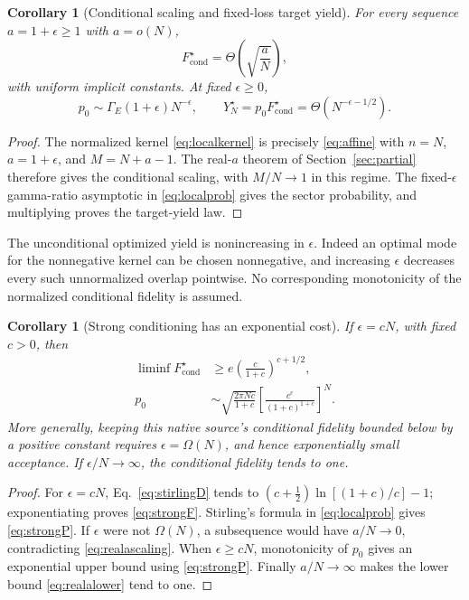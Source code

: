 \documentclass[11pt,a4paper]{article}
\newtheorem{corollary}[theorem]{Corollary}
\newcommand{\GE}{\Gamma_{\!E}}
\begin{document}
\begin{corollary}[Conditional scaling and fixed-loss target yield]
For every sequence \(a=1+\epsilon\ge1\) with \(a=o(N)\),
\begin{equation}
 F_{\mathrm{cond}}^\star
 =\Theta\!\left(\sqrt{\frac aN}\right),
 \label{eq:localconditionalscaling}
\end{equation}
with uniform implicit constants. At fixed \(\epsilon\ge0\),
\begin{equation}
 p_0\sim\GE(1+\epsilon)N^{-\epsilon},\qquad
 Y_N^\star=p_0F_{\mathrm{cond}}^\star
 =\Theta(N^{-\epsilon-1/2}).
 \label{eq:fixedlossyield}
\end{equation}
\end{corollary}
\begin{proof}
The normalized kernel \eqref{eq:localkernel} is precisely
\eqref{eq:affine} with \(n=N\), \(a=1+\epsilon\), and
\(M=N+a-1\). The real-\(a\) theorem of Section~\ref{sec:partial}
therefore gives the conditional scaling, with
\(M/N\to1\) in this regime. The fixed-\(\epsilon\) gamma-ratio
asymptotic in \eqref{eq:localprob} gives the sector probability,
and multiplying proves the target-yield law.
\end{proof}

The unconditional optimized yield is nonincreasing in \(\epsilon\).
Indeed an optimal mode for the nonnegative kernel can be chosen
nonnegative, and increasing \(\epsilon\) decreases every such
unnormalized overlap pointwise. No corresponding monotonicity of
the normalized conditional fidelity is assumed.

\begin{corollary}[Strong conditioning has an exponential cost]
If \(\epsilon=cN\), with fixed \(c>0\), then
\begin{align}
 \liminf F_{\mathrm{cond}}^\star
 &\ge e\left(\frac c{1+c}\right)^{c+1/2}, \label{eq:strongF}\\
 p_0&\sim\sqrt{\frac{2\pi Nc}{1+c}}
 \left[\frac{c^c}{(1+c)^{1+c}}\right]^N. \label{eq:strongP}
\end{align}
More generally, keeping this native source's conditional fidelity
bounded below by a positive constant requires
\(\epsilon=\Omega(N)\), and hence exponentially small acceptance.
If \(\epsilon/N\to\infty\), the conditional fidelity tends to one.
\end{corollary}
\begin{proof}
For \(\epsilon=cN\), Eq.~\eqref{eq:stirlingD} tends to
\((c+\tfrac12)\ln[(1+c)/c]-1\); exponentiating proves
\eqref{eq:strongF}. Stirling's formula in \eqref{eq:localprob}
gives \eqref{eq:strongP}. If \(\epsilon\) were not \(\Omega(N)\),
a subsequence would have \(a/N\to0\), contradicting
\eqref{eq:realascaling}. When \(\epsilon\ge cN\), monotonicity of
\(p_0\) gives an exponential upper bound using \eqref{eq:strongP}.
Finally \(a/N\to\infty\) makes the lower bound
\eqref{eq:realalower} tend to one.
\end{proof}
\end{document}
